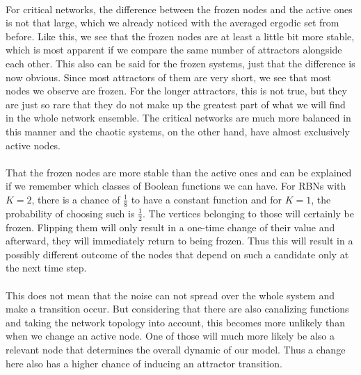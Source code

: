 \paragraph*{}
For critical networks, the difference between the frozen nodes and the active ones is not that large, which we already noticed with the averaged ergodic set from before. Like this, we see that the frozen nodes are at least a little bit more stable, which is most apparent if we compare the same number of attractors alongside each other. This also can be said for the frozen systems, just that the difference is now obvious. Since most attractors of them are very short, we see that most nodes we observe are frozen. For the longer attractors, this is not true, but they are just so rare that they do not make up the greatest part of what we will find in the whole network ensemble. The critical networks are much more balanced in this manner and the chaotic systems, on the other hand, have almost exclusively active nodes.

\paragraph*{}
That the frozen nodes are more stable than the active ones and can be explained if we remember which classes of Boolean functions we can have. For RBNs with $K=2$, there is a chance of $\tfrac{1}{8}$ to have a constant function and for $K=1$, the probability of choosing such is $\tfrac{1}{2}$. The vertices belonging to those will certainly be frozen. Flipping them will only result in a one-time change of their value and afterward, they will immediately return to being frozen. Thus this will result in a possibly different outcome of the nodes that depend on such a candidate only at the next time step. 

\paragraph*{}
This does not mean that the noise can not spread over the whole system and make a transition occur. But considering that there are also canalizing functions and taking the network topology into account, this becomes more unlikely than when we change an active node. One of those will much more likely be also a relevant node that determines the overall dynamic of our model. Thus a change here also has a higher chance of inducing an attractor transition.

